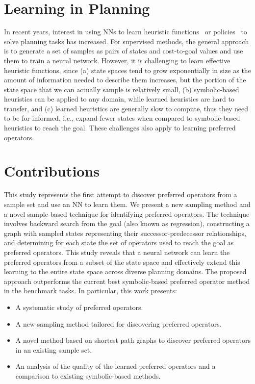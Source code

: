 \documentclass[ppgc,diss,english]{iiufrgs}
\begin{document}
\section{Learning in Planning}
\label{sec:intro-learning-planning}
In recent years, interest in using NNs to learn heuristic functions~\cite{Ferber.etal/2020a,Yu.etal/2020,Shen.etal/2020,Ferber.etal/2022,OToole/2022} or policies~\cite{Toyer.etal/2018,Toyer.etal/2020,Stahlberg.etal/2022} to solve planning tasks has increased. For supervised methods, the general approach is to generate a set of samples as pairs of states and cost-to-goal values and use them to train a neural network. However, it is challenging to learn effective heuristic functions, since (a) state spaces tend to grow exponentially in size as the amount of information needed to describe them increases, but the portion of the state space that we can actually sample is relatively small, (b) symbolic-based heuristics can be applied to any domain, while learned heuristics are hard to transfer, and (c) learned heuristics are generally slow to compute, thus they need to be for informed, i.e., expand fewer states when compared to symbolic-based heuristics to reach the goal. These challenges also apply to learning preferred operators.

\section{Contributions}
\label{sec:intro-contributions}
This study represents the first attempt to discover preferred operators from a sample set and use an NN to learn them. We present a new sampling method and a novel sample-based technique for identifying preferred operators. The technique involves backward search from the goal (also known as regression), constructing a graph with sampled states representing their successor-predecessor relationships, and determining for each state the set of operators used to reach the goal as preferred operators. This study reveals that a neural network can learn the preferred operators from a subset of the state space and effectively extend this learning to the entire state space across diverse planning domains. The proposed approach outperforms the current best symbolic-based preferred operator method in the benchmark tasks. In particular, this work presents:

\begin{itemize}
\item A systematic study of preferred operators.
\item A new sampling method tailored for discovering preferred operators.
\item A novel method based on shortest path graphs to discover preferred operators in an existing sample set.
\item An analysis of the quality of the learned preferred operators and a comparison to existing symbolic-based methods.
\end{itemize}
%
%
\end{document}
